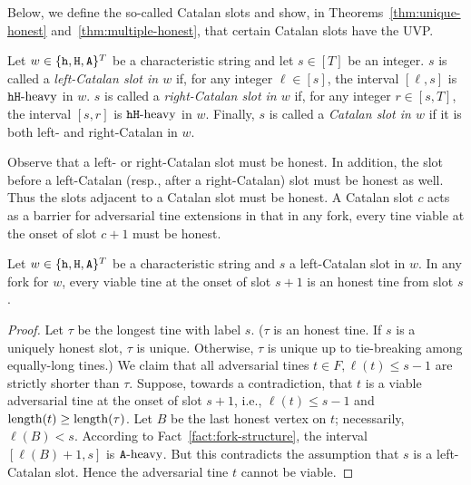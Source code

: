     




Below, we define the so-called Catalan slots and show, 
in Theorems~\ref{thm:unique-honest} and~\ref{thm:multiple-honest}, 
that certain Catalan slots have the UVP.

\begin{definition}
  Let $w \in \{\mathtt{h}, \mathtt{H}, \mathtt{A}\}^T$ be a characteristic string and 
  let $s \in [T]$ be an integer. 
  $s$ is called a \emph{left-Catalan slot in $w$} 
  if, for any integer $\ell \in [s]$, the interval $[\ell, s]$ is $\mathtt{h}\mathtt{H}\text{-heavy}$ in $w$.
  $s$ is called a \emph{right-Catalan slot in $w$} 
  if, for any integer $r \in [s, T]$, the interval $[s, r]$ is $\mathtt{h}\mathtt{H}\text{-heavy}$ in $w$.
  Finally, $s$ is called a \emph{Catalan slot in $w$} if 
  it is both left- and right-Catalan in $w$. 
\end{definition}
Observe that a left- or right-Catalan slot must be honest. 
In addition, the slot before a left-Catalan 
(resp., after a right-Catalan) slot must be honest as well.
Thus the slots adjacent to a Catalan slot must be honest. 
A Catalan slot $c$ acts as a barrier for adversarial tine extensions 
in that in any fork, every tine viable at the onset of slot $c+1$ must be honest. 


\begin{fact}\label{fact:catalan-unique-longest}
  Let $w \in \{\mathtt{h}, \mathtt{H}, \mathtt{A}\}^T$ be a characteristic string 
  and $s$ a left-Catalan slot in $w$. 
  In any fork for $w$, 
  every viable tine at the onset of slot $s + 1$ is 
  an honest tine from slot $s$. 
\end{fact}
\begin{proof}
  Let $\tau$ be the longest tine with label $s$. 
  ($\tau$ is an honest tine. 
  If $s$ is a uniquely honest slot, 
  $\tau$ is unique. Otherwise, 
  $\tau$ is unique up to tie-breaking among equally-long tines.)
  We claim that 
  all adversarial tines $t \in F, \ell(t) \leq s - 1$ 
  are strictly shorter than $\tau$.
  Suppose, towards a contradiction, that 
  $t$ is a viable adversarial tine at the onset of slot $s + 1$, i.e., 
  $\ell(t) \leq s - 1$ and $\operatorname{length}(t) \geq \operatorname{length}(\tau)$. 
  Let $B$ be the last honest vertex on $t$; necessarily, $\ell(B) < s$. 
  According to 
  Fact~\ref{fact:fork-structure},
  the interval $[\ell(B) + 1, s]$ is $\mathtt{A}\text{-heavy}$. 
  But this contradicts the assumption that $s$ is a left-Catalan slot. 
  Hence the adversarial tine $t$ cannot be viable.
\end{proof}



